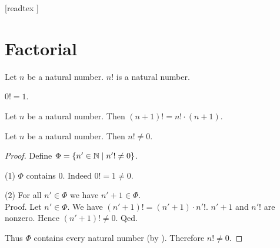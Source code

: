 \documentclass[10pt]{article}
\begin{document}
  \begin{imports}
    \begin{forthel}
      [readtex ]
    \end{forthel}
  \end{imports}


  \section*{Factorial}

  \begin{forthel}
    \begin{signature}
      Let $n$ be a natural number.
      $n!$ is a natural number.
    \end{signature}
  \end{forthel}

  \begin{forthel}
    \begin{axiom}
      $0! = 1$.
    \end{axiom}
  \end{forthel}

  \begin{forthel}
    \begin{axiom}
      Let $n$ be a natural number.
      Then $(n + 1)! = n! \cdot (n + 1)$.
    \end{axiom}
  \end{forthel}

  \begin{forthel}
    \begin{proposition}
      Let $n$ be a natural number.
      Then $n! \neq 0$.
    \end{proposition}
    \begin{proof}
      Define $\Phi = \{n' \in \mathbb{N} \mid n'! \neq 0 \}$.

      (1) $\Phi$ contains $0$.
      Indeed $0! = 1 \neq 0$.

      (2) For all $n' \in \Phi$ we have $n' + 1 \in \Phi$. \\
      Proof.
        Let $n' \in \Phi$.
        We have $(n' + 1)! = (n' + 1) \cdot n'!$.
        $n' + 1$ and $n'!$ are nonzero.
        Hence $(n' + 1)! \neq 0$.
      Qed.

      Thus $\Phi$ contains every natural number (by ).
      Therefore $n! \neq 0$.
    \end{proof}
  \end{forthel}
\end{document}
